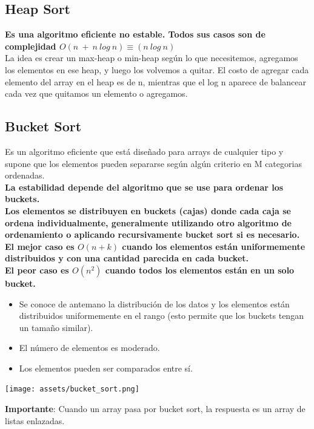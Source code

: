 \documentclass[10pt,a4paper]{article}
\begin{document}
\subsection*{Heap Sort}
\textbf{Es una algoritmo eficiente no estable. Todos sus casos son de complejidad $O(n \ + \ n \ log \ n) \equiv (n \ log \ n) $} \\
La idea es crear un max-heap o min-heap según lo que necesitemos, agregamos los elementos en ese heap, y luego los volvemos a quitar. El costo de agregar cada elemento del array en el heap es de n, mientras que el log n aparece de balancear cada vez que quitamos un elemento o agregamos.
\subsection*{Bucket Sort}
Es un algoritmo eficiente que está diseñado para arrays de cualquier tipo y supone que los elementos pueden separarse según algún criterio en M categorias ordenadas. \\ \textbf{La estabilidad depende del algoritmo que se use para ordenar los buckets.} \\ \textbf{Los elementos se distribuyen en buckets (cajas) donde cada caja se ordena individualmente, generalmente utilizando otro algoritmo de ordenamiento o aplicando recursivamente bucket sort si es necesario.} \\
\textbf{El mejor caso es $O(n+k)$ cuando los elementos están uniformemente distribuidos y con una cantidad parecida en cada bucket.} \\
\textbf{El peor caso es $O(n^{2})$ cuando todos los elementos están en un solo bucket.}
\begin{itemize}
    \item Se conoce de antemano la distribución de los datos y los elementos están distribuidos uniformemente en el rango (esto permite que los buckets tengan un tamaño similar).
    \item El número de elementos es moderado.
    \item Los elementos pueden ser comparados entre sí.
\end{itemize}
\begin{center}
    \begin{minipage}[b]{0.7\textwidth}
        \texttt{[image: assets/bucket\_sort.png]}
        \centering
        \label{fig:bucket_sort}
    \end{minipage}
\end{center}
\textbf{Importante}: Cuando un array pasa por bucket sort, la respuesta es un array de listas enlazadas.
\end{document}

